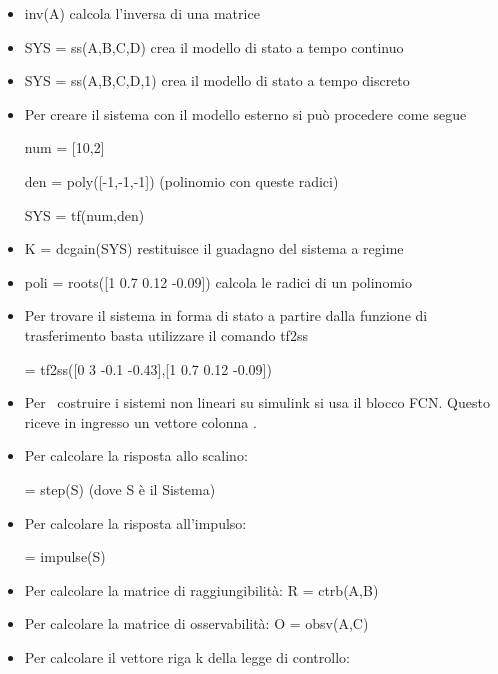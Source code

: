 \documentclass[10pt,a4paper]{book}
\begin{document}
\begin{itemize}
	\item {\selectfont inv(A)} calcola l’inversa di una matrice
	\item {\selectfont SYS = ss(A,B,C,D)} crea il modello di stato a tempo continuo
	\item {\selectfont SYS = ss(A,B,C,D,1)} crea il modello di stato a tempo discreto
	\item Per creare il sistema con il modello esterno si può procedere come segue
	      
	      {\selectfont num = [10,2]}
	      
	      {\selectfont den = poly([-1,-1,-1])} (polinomio con queste radici)
	      
	      {\selectfont SYS = tf(num,den)}
	\item {\selectfont K = dcgain(SYS)} restituisce il guadagno del sistema a regime
	\item {\selectfont poli = roots([1 0.7 0.12 -0.09])} calcola le radici di un polinomio
	\item Per trovare il sistema in forma di stato a partire dalla funzione di trasferimento basta utilizzare il comando tf2ss
	      
	      {\selectfont [A,B,C,D] = tf2ss([0 3 -0.1 -0.43],[1 0.7 0.12 -0.09])}
	\item Per \ costruire i sistemi non lineari su simulink si usa il blocco FCN. Questo riceve in ingresso un vettore colonna {\selectfont [u(1)…u(n)]}.

	\item Per calcolare la risposta allo scalino:
	      
	      { = step(S)} (dove S è il Sistema)
	\item Per calcolare la risposta all’impulso:
	      
	      { = impulse(S)}

	\item Per calcolare la matrice di raggiungibilità: {\selectfont R = ctrb(A,B)}
	\item Per calcolare la matrice di osservabilità: {\selectfont O = obsv(A,C)}
	\item Per calcolare il vettore riga {\selectfont k} della legge di controllo:
	      

\end{itemize}
\end{document}
